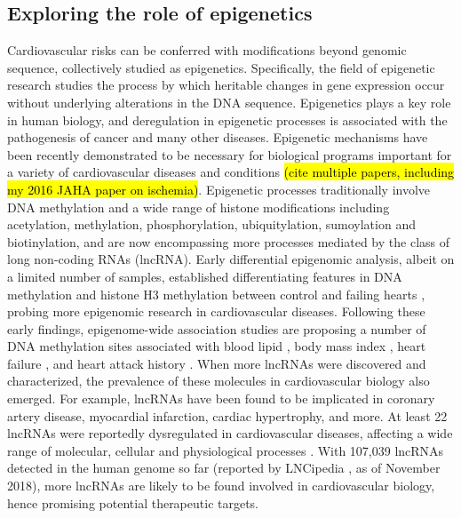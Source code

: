 \documentclass[letter]{bioinfo}
\begin{document}
\subsection*{Exploring the role of epigenetics}	
	Cardiovascular risks can be conferred with modifications beyond genomic sequence, collectively studied as epigenetics. Specifically, the field of epigenetic research studies the process by which heritable changes in gene expression occur without underlying alterations in the DNA sequence. Epigenetics plays a key role in human biology, and deregulation in epigenetic processes is associated with the pathogenesis of cancer and many other diseases. Epigenetic mechanisms have been recently demonstrated to be necessary for biological programs important for a variety of cardiovascular diseases and conditions \hl{(cite multiple papers, including my 2016 JAHA paper on ischemia)}. Epigenetic processes traditionally involve DNA methylation and a wide range of histone modifications including acetylation, methylation, phosphorylation, ubiquitylation, sumoylation and biotinylation, and are now encompassing more processes mediated by the class of long non-coding RNAs (lncRNA). Early differential epigenomic analysis, albeit on a limited number of samples, established differentiating features in DNA methylation and histone H3 methylation between control and failing hearts \citep{Movassagh:2011:Distinct}, probing more epigenomic research in cardiovascular diseases. Following these early findings, epigenome-wide association studies are proposing a number of DNA methylation sites associated with blood lipid \citep{Irvin:2014:Epigenomewide}, body mass index \citep{Dick:2014:DNA, Wahl:2017:Epigenomewide}, heart failure \citep{Meder:2017:EpigenomeWide}, and heart attack history \citep{Rask-Andersen:2016:Epigenomewide}.
	When more lncRNAs were discovered and characterized, the prevalence of these molecules in cardiovascular biology also emerged. For example, lncRNAs have been found to be implicated in coronary artery disease, myocardial infarction, cardiac hypertrophy, and more. At least 22 lncRNAs were reportedly dysregulated in cardiovascular diseases, affecting a wide range of molecular, cellular and physiological processes \citep{Das:2018:Deciphering}. With 107,039 lncRNAs detected in the human genome so far (reported by LNCipedia \citep{Volders:2018:LNCipedia}, as of November 2018), more lncRNAs are likely to be found involved in cardiovascular biology, hence promising potential therapeutic targets.
\end{document}
